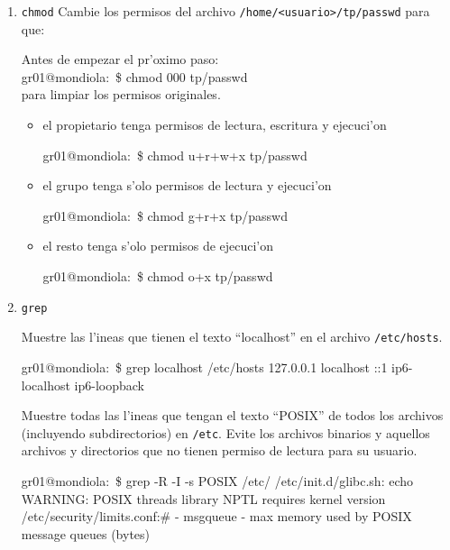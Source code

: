 \begin{enumerate}
\item \texttt{chmod} Cambie los permisos del archivo \texttt{/home/<usuario>/tp/passwd} para que:

\begin{envRespuesta}
Antes de empezar el pr'oximo paso: \\
gr01@mondiola:~\$ chmod 000 tp/passwd \\
para limpiar los permisos originales.
\end{envRespuesta}
\begin{itemize}
\item el propietario tenga permisos de lectura, escritura y ejecuci'on

\begin{envRespuesta}
gr01@mondiola:~\$ chmod u+r+w+x tp/passwd
\end{envRespuesta}

\item el grupo tenga s'olo permisos de lectura y ejecuci'on

\begin{envRespuesta}
gr01@mondiola:~\$ chmod g+r+x tp/passwd
\end{envRespuesta}

\item el resto tenga s'olo permisos de ejecuci'on

\begin{envRespuesta}
gr01@mondiola:~\$ chmod o+x tp/passwd
\end{envRespuesta}
\end{itemize}

\item \texttt{grep}

Muestre las l'ineas que tienen el texto ``localhost'' en el archivo \texttt{/etc/hosts}.

\begin{envCodigo}
gr01@mondiola:~\$ grep localhost /etc/hosts
127.0.0.1   localhost
::1     ip6-localhost ip6-loopback
\end{envCodigo}

Muestre todas las l'ineas que tengan el texto ``POSIX'' de todos los archivos (incluyendo subdirectorios) en \texttt{/etc}.
Evite los archivos binarios y aquellos archivos y directorios que no tienen permiso de lectura para su usuario.

\begin{envCodigo}
gr01@mondiola:~\$ grep -R -I -s POSIX /etc/
/etc/init.d/glibc.sh:                echo WARNING: POSIX threads library NPTL
                                     requires kernel version
/etc/security/limits.conf:#        - msgqueue - max memory used by POSIX
                                     message queues (bytes)
\end{envCodigo}


\end{enumerate}
